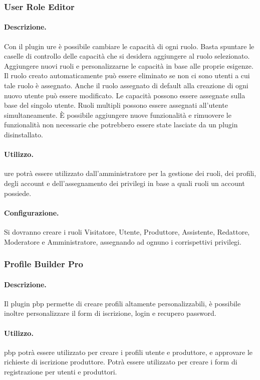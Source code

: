 \subsubsection{User Role Editor}
\paragraph{Descrizione.} Con il plugin \gls{ure} è possibile cambiare le capacità di ogni ruolo. Basta spuntare le caselle di controllo delle capacità che si desidera aggiungere al ruolo selezionato. Aggiungere nuovi ruoli e personalizzarne le capacità in base alle proprie esigenze. Il ruolo creato automaticamente può essere eliminato se non ci sono utenti a cui tale ruolo è assegnato. Anche il ruolo assegnato di default alla creazione di ogni nuovo utente può essere modificato. Le capacità possono essere assegnate sulla base del singolo utente. Ruoli multipli possono essere assegnati all'utente simultaneamente. È possibile aggiungere nuove funzionalità e rimuovere le funzionalità non necessarie che potrebbero essere state lasciate da un plugin disinstallato.
\paragraph{Utilizzo.} \gls{ure} potrà essere utilizzato dall'amministratore per la gestione dei ruoli, dei profili, degli account e dell'assegnamento dei privilegi in base a quali ruoli un account possiede.
\paragraph{Configurazione.} Si dovranno creare i ruoli Visitatore, Utente, Produttore, Assistente, Redattore, Moderatore e Amministratore, assegnando ad ognuno i corrispettivi privilegi.

\subsubsection{Profile Builder Pro}
\paragraph{Descrizione.} Il plugin \gls{pbp} permette di creare profili altamente personalizzabili, è possibile inoltre personalizzare il form di iscrizione, login e recupero password. 
\paragraph{Utilizzo.}  \gls{pbp} potrà essere utilizzato per creare i profili utente e produttore, e approvare le richieste di iscrizione produttore. Potrà essere utilizzato per creare i form di registrazione per utenti e produttori.

